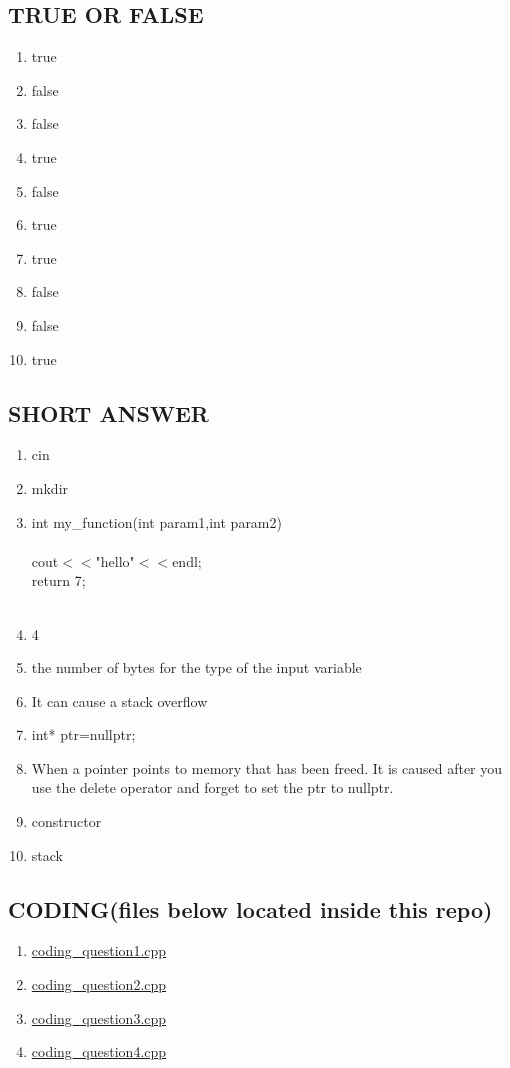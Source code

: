 \documentclass[a4paper]{article}
\begin{document}
\subsection{TRUE OR FALSE}
\begin{enumerate}
    \item true
    \item false
    \item false
    \item true
    \item false
    \item true
    \item true
    \item false
    \item false
    \item true
\end{enumerate}

\subsection{SHORT ANSWER}
\begin{enumerate}
    \item cin
    \item mkdir
    \item int my\_function(int param1,int param2)\\
    {\\
    cout$<<$"hello"$<<$endl;\\
    return 7;\\
    }\\
    \item 4
    \item the number of bytes for the type of the input variable
    \item It can cause a stack overflow
    \item int* ptr=nullptr;
    \item When a pointer points to memory that has been freed. It is caused after
          you use the delete operator and forget to set the ptr to nullptr.
    \item constructor
    \item stack
\end{enumerate}

\subsection{CODING(files below located inside this repo)}
\begin{enumerate}
    \item \href{run:./coding_question1.cpp}{coding\_question1.cpp}
    \item \href{run:./coding_question2.cpp}{coding\_question2.cpp}
    \item \href{run:./coding_question3.cpp}{coding\_question3.cpp}
    \item \href{run:./coding_question4.cpp}{coding\_question4.cpp}
\end{enumerate}
\end{document}
